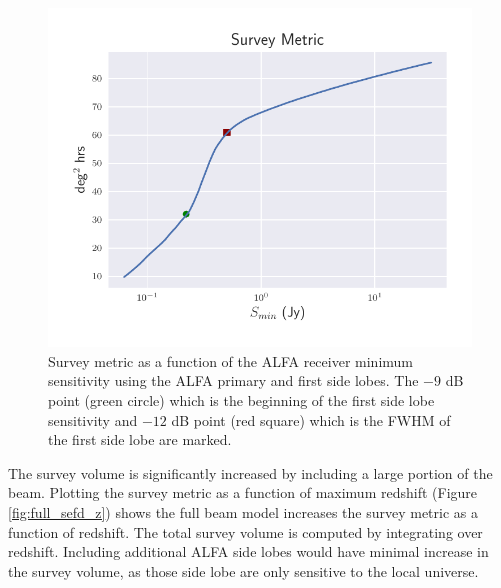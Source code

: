 \documentclass[a4paper,fleqn,usenatbib]{mnras}
\begin{document}
\begin{figure}
    \includegraphics[width=1.0\linewidth]{figures/full_survey_metric_sense.pdf}
    \caption{Survey metric as a function of the ALFA receiver minimum
    sensitivity using the ALFA primary and first side lobes. The $-9$ dB point
    (green circle) which is the beginning of the first side lobe sensitivity and
    $-12$ dB point (red square) which is the FWHM of the first side lobe are marked.
    }
    \label{fig:survey_metric_sense}
\end{figure}

The survey volume is significantly increased by including a large portion of the
beam. Plotting the survey metric as a function of maximum redshift (Figure
\ref{fig:full_sefd_z}) shows the full beam model increases the survey metric as
a function of redshift. The total survey volume is computed by integrating over
redshift.  Including additional ALFA side lobes would have minimal increase in
the survey volume, as those side lobe are only sensitive to the local universe.
\end{document}
